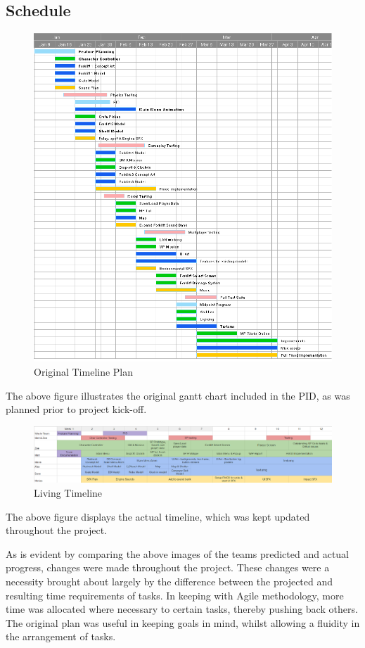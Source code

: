 \documentclass[12pt]{article}
\begin{document}
\subsection{Schedule} 
\begin{figure}[H]
	\caption{Original Timeline Plan}
	\includegraphics[width=\textwidth]{images/ganttChart}
\end{figure}
The above figure illustrates the original gantt chart included in the PID, as was planned prior to project kick-off. 
\begin{figure}[H]
	\caption{Living Timeline}
	\includegraphics[scale=0.4]{images/livingTimeline}
\end{figure}
The above figure displays the actual timeline, which was kept updated throughout the project. 

As is evident by comparing the above images of the teams predicted and actual progress, changes were made throughout the project. These changes were a necessity brought about largely by the difference between the projected and resulting time requirements of tasks. In keeping with Agile methodology, more time was allocated where necessary to certain tasks, thereby pushing back others. The original plan was useful in keeping goals in mind, whilst allowing a fluidity in the arrangement of tasks. 
\end{document}
